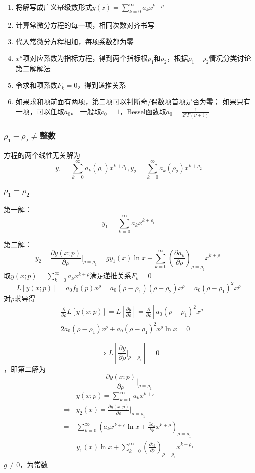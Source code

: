 \begin{mtd}[第一解的求法]$$$$
    \begin{enumerate}
        \item 将解写成广义幂级数形式$y(x)=\sum_{k=0}^\infty a_kx^{k+\rho}$
        \item 计算常微分方程的每一项，相同次数对齐书写
        \item 代入常微分方程相加，每项系数都为零
        \item $x^\rho$项对应系数为指标方程，得到两个指标根$\rho_1$和$\rho_2$，根据$\rho_1-\rho_2$情况分类讨论第二解解法
        \item 令求和项系数$F_k=0$，得到递推关系
        \item 如果求和项前面有两项，第二项可以判断奇/偶数项首项是否为零；
        如果只有一项，可以任取$a_0$。
        一般取$a_0=1$，Bessel函数取$a_0=\frac{1}{2^\nu\Gamma(\nu+1)}$
    \end{enumerate}

\end{mtd}
\subsubsection{$\rho_1-\rho_2\ne$整数}
方程的两个线性无关解为
$$y_1=\sum_{k=0}^\infty a_k(\rho_1)x^{k+\rho_1},y_2=\sum_{k=0}^\infty a_k(\rho_2)x^{k+\rho_2}$$
\subsubsection{$\rho_1=\rho_2$}
第一解：
$$y_1=\sum_{k=0}^\infty a_kx^{k+\rho_1}$$

第二解：$$y_2=\frac{\partial y(x;p)}{\partial\rho}\bigg|_{\rho=\rho_1}=gy_1(x)\ln x+\sum_{k=0}^\infty\left(\frac{\partial a_k}{\partial\rho}\right)_{\rho=\rho_1}x^{k+\rho_1}$$
取$y(x;p)=\sum_{k=0}^\infty a_kx^{k+\rho}$满足递推关系$F_k=0$
$$L[y(x;p)]=a_0f_0(p)x^\rho=a_0(\rho-\rho_1)(\rho-\rho_2)x^\rho=a_0(\rho-\rho_1)^2x^\rho$$
对$\rho$求导得
$$\begin{aligned}
&\frac{\partial}{\partial\rho}L[y(x;p)]=L\left[\frac{\partial y}{\partial\rho}\right]=\frac{\partial}{\partial\rho}[a_0(\rho-\rho_1)^2x^\rho]\\
=&2a_0(\rho-\rho_1)x^\rho+a_0(\rho-\rho_1)^2x^\rho\ln x=0
\end{aligned}$$

$$\Rightarrow L\left[\frac{\partial y}{\partial\rho}\bigg|_{\rho=\rho_1}\right]=0$$
，即第二解为$$\boxed{\frac{\partial y(x;p)}{\partial\rho}\bigg|_{\rho=\rho_1}}$$
$$\begin{aligned}
 &y(x;p)=\sum_{k=0}^\infty a_kx^{k+\rho} \\
 \Rightarrow&y_2(x)=\frac{\partial y(x;p)}{\partial\rho}\bigg|_{\rho=\rho_1}\\
=&\sum_{k=0}^\infty\left(a_kx^{k+\rho}\ln x+\frac{\partial a_k}{\partial\rho}x^{k+\rho}\right)_{\rho=\rho_1}\\
=&y_1(x)\ln x+\sum_{k=0}^\infty\left(\frac{\partial a_k}{\partial\rho}\right)_{\rho=\rho_1}x^{k+\rho_1}
\end{aligned}$$
$g\ne0$，为常数

